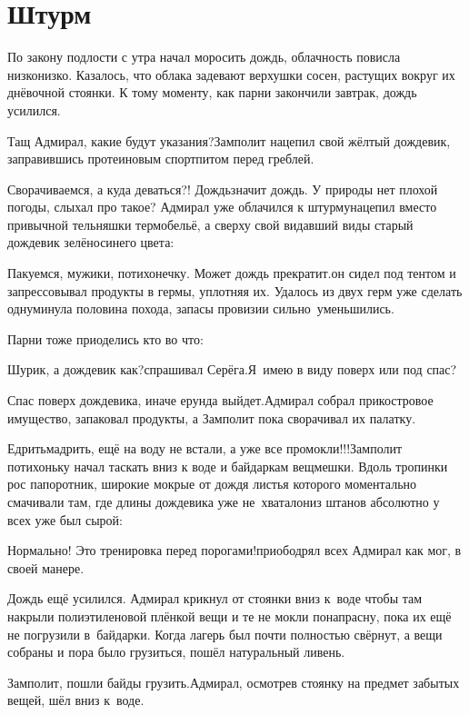 \chapter{Штурм}
\vepsianrose

По закону подлости с утра начал моросить дождь, облачность повисла низко\sdash низко. Казалось, что облака задевают верхушки сосен, растущих вокруг их днёвочной стоянки. К тому моменту, как парни закончили завтрак, дождь усилился.

\diagdash Тащ Адмирал, какие будут указания?\mdash Замполит нацепил свой жёлтый дождевик, заправившись протеиновым спортпитом перед греблей.

\diagdash Сворачиваемся, а куда деваться?! Дождь\mdash значит дождь. У природы нет плохой погоды, слыхал про такое? \mdash Адмирал уже облачился к штурму\mdash нацепил вместо привычной тельняшки термобельё, а сверху свой видавший виды старый дождевик зелёно\sdash синего цвета:

\diagdash Пакуемся, мужики, потихонечку. Может дождь прекратит.\mdash он сидел под тентом и запрессовывал продукты в гермы, уплотняя их. Удалось из двух герм уже сделать одну\mdash минула половина похода, запасы провизии сильно~уменьшились.

Парни тоже приоделись кто во что: 

\diagdash Шурик, а дождевик как?\mdash спрашивал Серёга.\mdash Я~имею в виду поверх или под спас?

\diagdash Спас поверх дождевика, иначе ерунда выйдет.\mdash Адмирал собрал прикостровое имущество, запаковал продукты, а Замполит пока сворачивал их палатку.

\diagdash Едрить\sdash мадрить, ещё на воду не встали, а уже все промокли!!!\mdash Замполит потихоньку начал таскать вниз к воде и байдаркам вещмешки. Вдоль тропинки рос папоротник, широкие мокрые от дождя листья которого моментально смачивали там, где длины дождевика уже не~хватало\mdash низ штанов абсолютно у всех уже был сырой:

\diagdash Нормально! Это тренировка перед порогами!\mdash приободрял всех Адмирал как мог, в своей манере.

Дождь ещё усилился. Адмирал крикнул от стоянки вниз к~воде чтобы там накрыли полиэтиленовой плёнкой вещи и те не мокли понапрасну, пока их ещё не погрузили в~байдарки. Когда лагерь был почти полностью свёрнут, а вещи собраны и пора было грузиться, пошёл натуральный ливень.

\diagdash Замполит, пошли байды грузить.\mdash Адмирал, осмотрев стоянку на предмет забытых вещей, шёл вниз к~воде.

